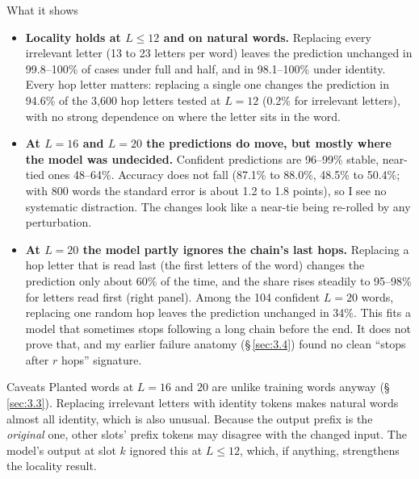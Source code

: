 \documentclass[paper=a4,fontsize=11pt,DIV=11,parskip=half,headings=small,numbers=noendperiod]{scrartcl}
\DeclareRobustCommand{\lead}[1]{\textsf{\bfseries\color{accent}#1}}
\DeclareRobustCommand{\code}[1]{{\fontseries{m}\ttfamily #1}}
\begin{document}
\begin{findbox}{What it shows}
\begin{itemize}
\item \lead{Locality holds at $L\le12$ and on natural words.} Replacing every irrelevant letter (13 to 23
  letters per word) leaves the prediction unchanged in 99.8–100\% of cases under \code{full} and \code{half},
  and in 98.1–100\% under \code{identity}. Every hop letter matters: replacing a single one changes the
  prediction in 94.6\% of the 3,600 hop letters tested at $L=12$ (0.2\% for irrelevant letters), with no strong
  dependence on where the letter sits in the word.
\item \lead{At $L=16$ and $L=20$ the predictions do move, but mostly where the model was undecided.} Confident
  predictions are 96–99\% stable, near-tied ones 48–64\%. Accuracy does not fall (87.1\% to 88.0\%, 48.5\% to
  50.4\%; with 800 words the standard error is about 1.2 to 1.8 points), so I see no systematic distraction. The
  changes look like a near-tie being re-rolled by any perturbation.
\item \lead{At $L=20$ the model partly ignores the chain’s last hops.} Replacing a hop letter that is read last
  (the first letters of the word) changes the prediction only about 60\% of the time, and the share rises
  steadily to 95–98\% for letters read first (right panel). Among the 104 confident $L=20$ words, replacing one
  random hop leaves the prediction unchanged in 34\%. This fits a model that sometimes stops following a long
  chain before the end. It does not prove that, and my earlier failure anatomy (\S\,\ref{sec:3.4}) found no
  clean “stops after $r$ hops” signature.
\end{itemize}
\end{findbox}

\begin{limbox}{Caveats}
Planted words at $L=16$ and $20$ are unlike training words anyway (\S\,\ref{sec:3.3}). Replacing irrelevant
letters with identity tokens makes natural words almost all identity, which is also unusual. Because the output
prefix is the \emph{original} one, other slots’ prefix tokens may disagree with the changed input. The model’s
output at slot $k$ ignored this at $L\le12$, which, if anything, strengthens the locality result.
\end{limbox}
\end{document}
